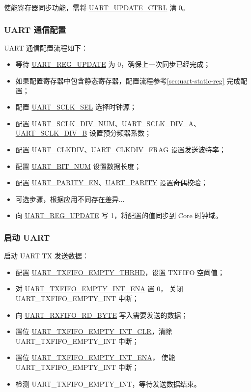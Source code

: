 \documentclass[main\_\_CN.tex]{subfiles}
\begin{document}
使能寄存器同步功能，需将 \hyperref[fielddesc:UARTUPDATECTRL]{UART\_UPDATE\_CTRL} 清 0。

\subsubsection{UART 通信配置}

UART 通信配置流程如下：
\begin{itemize}
    \item 等待 \hyperref[fielddesc:UARTREGUPDATE]{UART\_REG\_UPDATE} 为 0，确保上一次同步已经完成；
    \item 如果配置寄存器中包含静态寄存器，配置流程参考\ref{sec:uart-static-reg} 完成配置；
    \item 配置 \hyperref[fielddesc:UARTSCLKSEL]{UART\_SCLK\_SEL} 选择时钟源；
    \item 配置 \hyperref[fielddesc:UARTSCLKDIVNUM]{UART\_SCLK\_DIV\_NUM}、\hyperref[fielddesc:UARTSCLKDIVA]{UART\_SCLK\_DIV\_A}、\hyperref[fielddesc:UARTSCLKDIVB]{UART\_SCLK\_DIV\_B} 设置预分频器系数；
    \item 配置 \hyperref[fielddesc:UARTCLKDIV]{UART\_CLKDIV}、\hyperref[fielddesc:UARTCLKDIVFRAG]{UART\_CLKDIV\_FRAG} 设置发送波特率；
    \item 配置 \hyperref[fielddesc:UARTBITNUM]{UART\_BIT\_NUM} 设置数据长度；
    \item 配置 \hyperref[fielddesc:UARTPARITYEN]{UART\_PARITY\_EN}、\hyperref[fielddesc:UARTPARITY]{UART\_PARITY} 设置奇偶校验；
    \item 可选步骤，根据应用不同存在差异...
    \item 向 \hyperref[fielddesc:UARTREGUPDATE]{UART\_REG\_UPDATE} 写 1，将配置的值同步到 Core 时钟域。
\end{itemize}

\subsubsection{启动 UART}
启动 UART TX 发送数据：
\begin{itemize}
    \item 配置 \hyperref[fielddesc:UARTTXFIFOEMPTYTHRHD]{UART\_TXFIFO\_EMPTY\_THRHD}，设置 TXFIFO 空阈值；
    \item 对 \hyperref[fielddesc:UARTTXFIFOEMPTYINTENA]{UART\_TXFIFO\_EMPTY\_INT\_ENA} 置 0， 关闭 UART\_TXFIFO\_EMPTY\_INT 中断；
    \item 向 \hyperref[fielddesc:UARTRXFIFORDBYTE]{UART\_RXFIFO\_RD\_BYTE} 写入需要发送的数据；
    \item 置位 \hyperref[fielddesc:UARTTXFIFOEMPTYINTCLR]{UART\_TXFIFO\_EMPTY\_INT\_CLR}，清除 UART\_TXFIFO\_EMPTY\_INT 中断；
    \item 置位 \hyperref[fielddesc:UARTTXFIFOEMPTYINTENA]{UART\_TXFIFO\_EMPTY\_INT\_ENA}， 使能 UART\_TXFIFO\_EMPTY\_INT 中断；
    \item 检测 UART\_TXFIFO\_EMPTY\_INT，等待发送数据结束。
\end{itemize}
\end{document}
